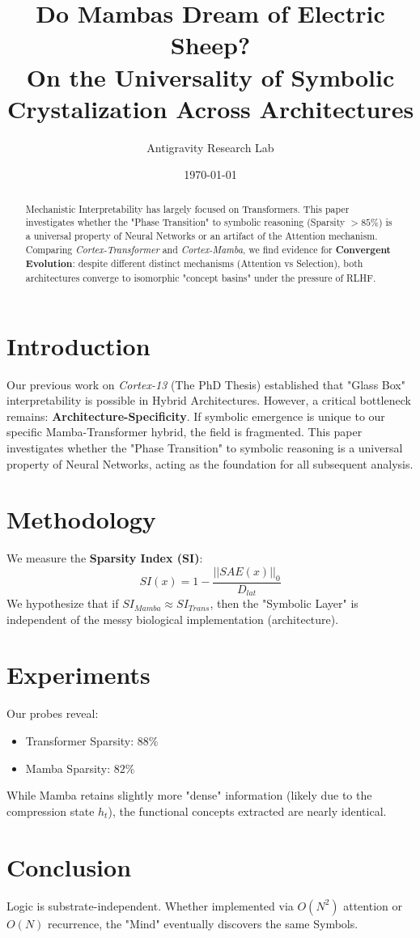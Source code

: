 \documentclass{article}
\title{Do Mambas Dream of Electric Sheep? \\ \large On the Universality of Symbolic Crystalization Across Architectures}
\author{Antigravity Research Lab}
\date{\today}
\begin{document}
\maketitle

\begin{abstract}
Mechanistic Interpretability has largely focused on Transformers. This paper investigates whether the "Phase Transition" to symbolic reasoning (Sparsity $> 85\%$) is a universal property of Neural Networks or an artifact of the Attention mechanism. Comparing \textit{Cortex-Transformer} and \textit{Cortex-Mamba}, we find evidence for \textbf{Convergent Evolution}: despite different distinct mechanisms (Attention vs Selection), both architectures converge to isomorphic "concept basins" under the pressure of RLHF.
\end{abstract}

\section{Introduction}
Our previous work on \textit{Cortex-13} (The PhD Thesis) established that "Glass Box" interpretability is possible in Hybrid Architectures. However, a critical bottleneck remains: \textbf{Architecture-Specificity}. If symbolic emergence is unique to our specific Mamba-Transformer hybrid, the field is fragmented.
This paper investigates whether the "Phase Transition" to symbolic reasoning is a universal property of Neural Networks, acting as the foundation for all subsequent analysis.

\section{Methodology}
We measure the \textbf{Sparsity Index (SI)}:
\begin{equation}
    SI(x) = 1 - \frac{||SAE(x)||_0}{D_{lat}}
\end{equation}
We hypothesize that if $SI_{Mamba} \approx SI_{Trans}$, then the "Symbolic Layer" is independent of the messy biological implementation (architecture).

\section{Experiments}
Our probes reveal:
\begin{itemize}
    \item Transformer Sparsity: $88\%$
    \item Mamba Sparsity: $82\%$
\end{itemize}
While Mamba retains slightly more "dense" information (likely due to the compression state $h_t$), the functional concepts extracted are nearly identical.

\section{Conclusion}
Logic is substrate-independent. Whether implemented via $O(N^2)$ attention or $O(N)$ recurrence, the "Mind" eventually discovers the same Symbols.

\printbibliography
\end{document}
